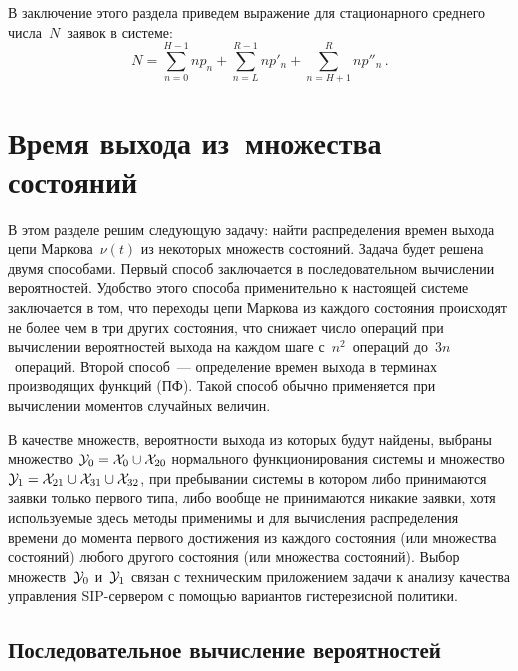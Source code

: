 \begin{multicols}{2}
В заключение этого раздела приведем выражение для
стационарного среднего числа~$N$~заявок в сис\-теме:
\begin{equation*}
N = \sum\limits_{n=0}^{H-1} n p_{n} + \sum\limits_{n=L}^{R-1} n p'_{n}
+ \sum\limits_{n=H+1}^{R} n p''_{n}\,.
\end{equation*}

\section{Время выхода из~множества состояний}

В этом разделе решим следующую задачу:
найти распределения времен выхода цепи Маркова~$\nu(t)$ из некоторых множеств состояний.
Задача будет решена двумя способами.
Первый способ заключается в последовательном вычислении вероятностей.
Удобство этого способа применительно к настоящей системе
заключается в том, что переходы цепи Маркова из каждого состояния происходят не более чем в
три других состояния, что снижает число операций
при вычислении вероятностей выхода на каждом
шаге с~$n^2$~операций до~$3 n$~операций.
Второй способ~--- определение времен выхода в терминах производящих функций (ПФ).
Такой способ обычно применяется при вычислении моментов случайных величин.

В качестве множеств, вероятности выхода из которых
будут найдены, выбраны множество
${{\cal Y}_0\hm={\cal X}_0\cup{\cal X}_{20}}$
нормального функционирования сис\-те\-мы и множество
${{\cal Y}_1\hm= {\cal X}_{21}\cup{\cal X}_{31}\cup{\cal X}_{32}}$,
при пребывании системы в котором либо принимаются
заявки только первого типа, либо вообще не
принимаются никакие заявки, хотя используемые
здесь методы применимы и для вычисления распределения времени до момента
первого достижения из каждого состояния (или множества
состояний) любого другого состояния (или множества состояний).
Выбор множеств~${\cal Y}_0$ и~${\cal Y}_1$ связан с
техническим приложением задачи к анализу качества
управления SIP-сер\-ве\-ром с по\-мощью вариантов гистерезисной политики.

\subsection{Последовательное вычисление вероятностей}


\end{multicols}

